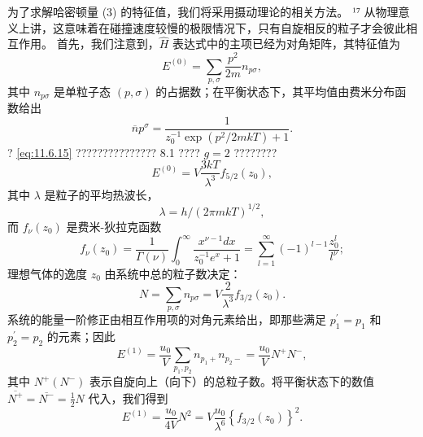 为了求解哈密顿量 (3) 的特征值，我们将采用摄动理论的相关方法。
¹⁷ 从物理意义上讲，这意味着在碰撞速度较慢的极限情况下，只有自旋相反的粒子才会彼此相互作用。
首先，我们注意到，\(\hat{H}\) 表达式中的主项已经为对角矩阵，其特征值为
\begin{equation}\tag{11.6.14}\label{eq:11.6.14}
E ^{( 0 )} = \sum _ { p , \sigma } \frac { p ^{2} } { 2 m } n _ { p \sigma } ,
\end{equation}
其中 \(n_{p\sigma}\) 是单粒子态 \((p,\sigma)\) 的占据数；在平衡状态下，其平均值由费米分布函数给出
\begin{equation}\tag{11.6.15}\label{eq:11.6.15}
\overline { { n } } p ^{\sigma} = \frac { 1 } { z _ { 0 } ^{- 1} \exp ( p ^{2} / 2 m k T ) + 1 } .
\end{equation}
? \autoref{eq:11.6.15} ??????????????? 8.1 ???? \(g=2\) ????????
\begin{equation}\tag{11.6.16}\label{eq:11.6.16}
E ^{( 0 )} = V \frac { 3 k T } { \lambda ^{3} } f _ { 5 / 2 } ( z _ { 0 } ) ,
\end{equation}
其中 \(\lambda\) 是粒子的平均热波长，
\begin{equation}\tag{11.6.17}\label{eq:11.6.17}
\lambda = h / ( 2 \pi m k T ) ^{1 / 2} ,
\end{equation}
而 \(f_{\nu}(z_{0})\) 是费米-狄拉克函数
\begin{equation}\tag{11.6.18}\label{eq:11.6.18}
f _ { \nu } ( z _ { 0 } ) = \frac { 1 } { \Gamma ( \nu ) } \int _ { 0 } ^{\infty} \frac { x ^{\nu - 1} d x } { z _ { 0 } ^{- 1} e ^{x} + 1 } = \sum _ { l = 1 } ^{\infty} ( - 1 ) ^{l - 1} \frac { z _ { 0 } ^{l} } { l ^{\nu} } ;
\end{equation}
理想气体的逸度 \(z_{0}\) 由系统中总的粒子数决定：
\begin{equation}\tag{11.6.19}\label{eq:11.6.19}
N = \sum _ { p , \sigma } n _ { p \sigma } = V \frac { 2 } { \lambda ^{3} } f _ { 3 / 2 } ( z _ { 0 } ) .
\end{equation}
系统的能量一阶修正由相互作用项的对角元素给出，即那些满足 \(p_{1}^{\prime}=p_{1}\) 和 \(p_{2}^{\prime}=p_{2}\) 的元素；因此
\begin{equation}\tag{11.6.20}\label{eq:11.6.20}
E ^{( 1 )} = \frac { u _ { 0 } } { V } \sum _ { p _ { 1 } , p _ { 2 } } n _ { p _ { 1 } + } n _ { p _ { 2 } - } = \frac { u _ { 0 } } { V } N ^{+} N ^{-} ,
\end{equation}
其中 \(N^{+}(N^{-})\) 表示自旋向上（向下）的总粒子数。将平衡状态下的数值 \(\overline{N^{+}}=\overline{N^{-}}=\frac{1}{2}N\) 代入，我们得到
\begin{equation}\tag{11.6.21}\label{eq:11.6.21}
E ^{( 1 )} = \frac { u _ { 0 } } { 4 V } N ^{2} = V \frac { u _ { 0 } } { \lambda ^{6} } \left\{ f _ { 3 / 2 } ( z _ { 0 } ) \right\} ^{2} .
\end{equation}

